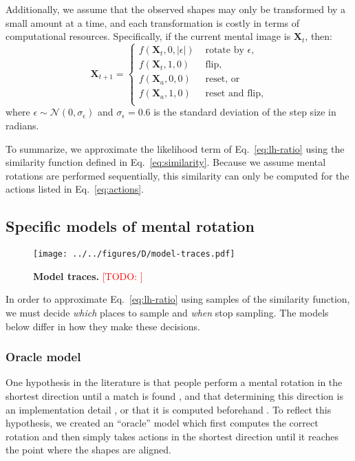 \documentclass[10pt,letterpaper]{article}
\newcommand{\TODO}[1]{\textcolor{red}{[TODO: #1]}}
\newcommand{\Xa}[0]{\mathbf{X}_a}
\newcommand{\Xt}[0]{\mathbf{X}_t}
\begin{document}
Additionally, we assume that the observed shapes may only be
transformed by a small amount at a time, and each transformation is
costly in terms of computational resources. Specifically, if the
current mental image is $\Xt$, then:
\begin{equation}
  \mathbf{X}_{t+1} = \left\{ \begin{array}{ll}
      f(\Xt, 0, |\epsilon|) &\mbox{ rotate by $\epsilon$,} \\
      f(\Xt, 1, 0) &\mbox{ flip,} \\
      f(\Xa, 0, 0) &\mbox{ reset, or} \\
      f(\Xa, 1, 0) &\mbox{ reset and flip,} \\
    \end{array} \right.
  \label{eq:actions}
\end{equation}
where $\epsilon\sim \mathcal{N}(0, \sigma_\epsilon)$ and
$\sigma_\epsilon=0.6$ is the standard deviation of the step size in
radians.

To summarize, we approximate the likelihood term of
Eq.~\ref{eq:lh-ratio} using the similarity function defined in
Eq.~\ref{eq:similarity}. Because we assume mental rotations are
performed sequentially, this similarity can only be computed for the
actions listed in Eq.~\ref{eq:actions}.

\subsection{Specific models of mental rotation}

\begin{figure*}[t]
  \begin{center}
    \texttt{[image: ../../figures/D/model-traces.pdf]}
    \caption{\textbf{Model traces.} \TODO{}}
    \label{fig:model-traces}
  \end{center}
\end{figure*}

In order to approximate Eq.~\ref{eq:lh-ratio} using samples of the
similarity function, we must decide \textit{which} places to sample
and \textit{when} stop sampling. The models below differ in how they
make these decisions.

\subsubsection{Oracle model}

One hypothesis in the literature is that people perform a mental
rotation in the shortest direction until a match is found
\cite{Shepard1971, Cooper:1975wp}, and that determining this direction
is an implementation detail \cite{Anderson1978}, or that it is
computed beforehand \cite{Funt:1983wn}.  To reflect this hypothesis,
we created an ``oracle'' model which first computes the correct
rotation and then simply takes actions in the shortest direction until
it reaches the point where the shapes are aligned.
\end{document}
